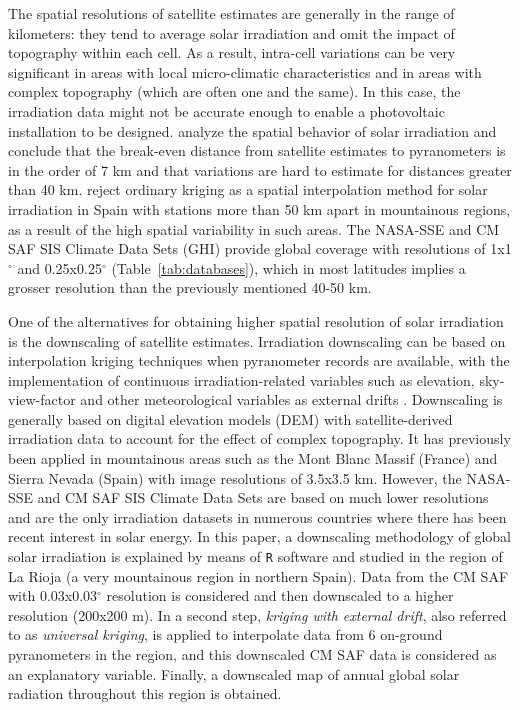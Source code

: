 \documentclass[11pt, english]{article}
\let\cite\citep
\begin{document}
The spatial resolutions of satellite
estimates are generally in the range of kilometers: they tend to
average solar irradiation and omit the impact of topography within
each cell. As a result, intra-cell variations can be very significant
in areas with local micro-climatic characteristics and in areas with
complex topography (which are often one and the same). In this case,
the irradiation data might not be accurate enough to enable a
photovoltaic installation to be designed. \cite{Perez.Seals.ea1994}
analyze the spatial behavior of solar irradiation and conclude that
the break-even distance from satellite estimates to pyranometers is in
the order of 7 km and that variations are hard to estimate for
distances greater than 40
km. \cite{Antonanzas-Torres.Canizares.ea2013} reject ordinary kriging
as a spatial interpolation method for solar irradiation in Spain with
stations more than 50 km apart in mountainous regions, as a result of
the high spatial variability in such areas. The NASA-SSE and CM SAF
SIS Climate Data Sets (GHI) provide global coverage with resolutions
of 1x1$^\circ$ and 0.25x0.25$^\circ$ (Table~\ref{tab:databases}),
which in most latitudes implies a grosser resolution than the
previously mentioned 40-50 km.


One of the alternatives for obtaining higher spatial resolution of
solar irradiation is the downscaling of satellite
estimates. Irradiation downscaling can be based on interpolation
kriging techniques when pyranometer records are available, with the
implementation of continuous irradiation-related variables such as
elevation, sky-view-factor and other meteorological variables as
external drifts \cite{Alsamamra.Ruiz-Arias.ea2009,
  Batlles.Bosch.ea2008}. Downscaling is generally based on digital
elevation models (DEM) with satellite-derived irradiation data to
account for the effect of complex topography. It has previously been
applied in mountainous areas such as the Mont Blanc Massif (France)
\cite{Corripio2003} and Sierra Nevada (Spain)
\cite{Bosch.Batlles.ea2010,Ruiz-Arias.Cebecauer.ea2010} with image
resolutions of 3.5x3.5 km. However, the NASA-SSE and CM SAF SIS
Climate Data Sets are based on much lower resolutions and are the only
irradiation datasets in numerous countries where there has been recent
interest in solar energy. In this paper, a downscaling methodology of
global solar irradiation is explained by means of \texttt{R} software
and studied in the region of La Rioja (a very mountainous region in
northern Spain). Data from the CM SAF with 0.03x0.03$^\circ$
resolution is considered and then downscaled to a higher resolution
(200x200 m). In a second step, \emph{kriging with external drift},
also referred to as \emph{universal kriging}, is applied to
interpolate data from 6 on-ground pyranometers in the region, and this
downscaled CM SAF data is considered as an explanatory
variable. Finally, a downscaled map of annual global solar radiation
throughout this region is obtained.
\end{document}
